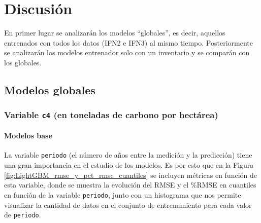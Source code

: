 \section{Discusión}
\label{sec:discusion}

En primer lugar se analizarán los modelos ``globales'', es decir, aquellos entrenados con todos los datos (IFN2 e IFN3) al mismo tiempo. Posteriormente se analizarán los modelos entrenador solo con un inventario y se comparán con los globales.


\subsection{Modelos globales}

\subsubsection{Variable \texttt{c4} (en toneladas de carbono por hectárea)}
\vspace{0.3cm}
\paragraph{Modelos base}

La variable \texttt{periodo} (el número de años entre la medición y la predicción) tiene una gran importancia en el estudio de los modelos. Es por esto que en la Figura \ref{fig:LightGBM_rmse_y_pct_rmse_cuantiles} se incluyen métricas en función de esta variable, donde se muestra la evolución del RMSE y el \%RMSE en cuantiles en función de la variable \texttt{periodo}, junto con un histograma que nos permite visualizar la cantidad de datos en el conjunto de entrenamiento para cada valor de \texttt{periodo}.

